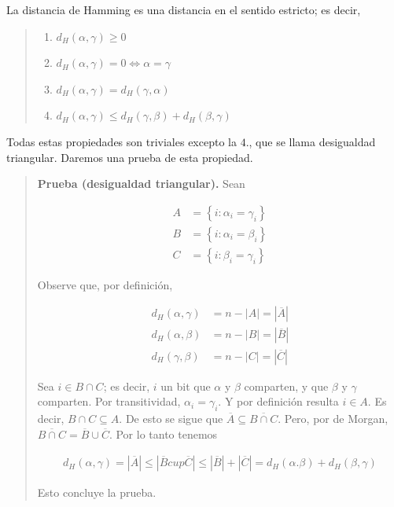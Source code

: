 \documentclass[a4paper]{article}
\begin{document}
La distancia de Hamming es una distancia en el sentido estricto; es decir, 


\small
\begin{quote}

\begin{enumerate}
    \item $d_H (\alpha, \gamma) \geq 0$ 
    \item $d_H(\alpha, \gamma) = 0 \iff \alpha = \gamma$
    \item $d_H(\alpha, \gamma) = d_H(\gamma, \alpha)$
    \item $d_H (\alpha, \gamma) \leq d_H(\gamma, \beta) + d_H(\beta,\gamma)$
\end{enumerate}

\end{quote}
\normalsize

Todas estas propiedades son triviales excepto la $4.$, que se llama desigualdad
triangular.  Daremos una prueba de esta propiedad. 


\small
\begin{quote}

\textbf{Prueba (desigualdad triangular).} Sean 

\begin{align*}
    A &= \left\{ i : \alpha_i = \gamma_i \right\}  \\ 
    B &= \left\{ i : \alpha_i = \beta_i \right\} \\
    C &= \left\{ i : \beta_i = \gamma_i \right\} 
\end{align*}

Observe que, por definición, 

\begin{align*}
    d_H (\alpha, \gamma) &= n - |A| = |\overline{A}| \\ 
    d_H (\alpha, \beta) &= n - |B| = |\overline{B}| \\ 
    d_H (\gamma, \beta) &= n - |C| = |\overline{C}|
\end{align*}

Sea $i \in  B \cap C$; es decir, $i$ un bit que $\alpha$ y $\beta$ comparten, y que
$\beta$ y $\gamma$ comparten. Por transitividad, $\alpha_i =\gamma_i$.
Y por definición resulta $i \in A$. Es decir, $B \cap C \subseteq A$.
De esto se sigue que $\overline{A} \subseteq \overline{B \cap C}$. Pero, por de Morgan, 
$\overline{B \cap C} = \overline{B} \cup \overline{C}$. Por lo tanto tenemos 

\begin{align*}
    d_H(\alpha, \gamma) = |\overline{A}| \leq |\overline{B} cup\overline{C}| \leq |\overline{B}| + |\overline{C}| = d_H(\alpha. \beta) + d_H(\beta, \gamma)
\end{align*}

Esto concluye la prueba.
\end{quote}
\normalsize
\end{document}
